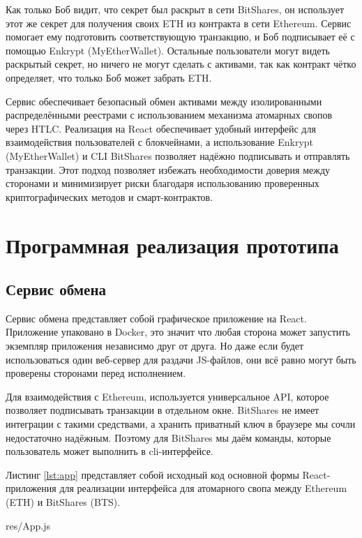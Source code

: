 Как только Боб видит, что секрет был раскрыт в сети BitShares, он использует этот же секрет для получения своих ETH из контракта в сети Ethereum. Сервис помогает ему подготовить соответствующую транзакцию, и Боб подписывает её с помощью Enkrypt (MyEtherWallet). Остальные пользователи могут видеть раскрытый секрет, но ничего не могут сделать с активами, так как контракт чётко определяет, что только Боб может забрать ETH.

Сервис обеспечивает безопасный обмен активами между изолированными распределёнными реестрами с использованием механизма атомарных свопов через HTLC. Реализация на React обеспечивает удобный интерфейс для взаимодействия пользователей с блокчейнами, а использование Enkrypt (MyEtherWallet) и CLI BitShares позволяет надёжно подписывать и отправлять транзакции. Этот подход позволяет избежать необходимости доверия между сторонами и минимизирует риски благодаря использованию проверенных криптографических методов и смарт-контрактов.

\section{Программная реализация прототипа}

\subsection{Сервис обмена}

Сервис обмена представляет собой графическое приложение на React. Приложение упаковано в Docker, это значит что любая сторона может запустить экземпляр приложения независимо друг от друга. Но даже если будет использоваться один веб-сервер для раздачи JS-файлов, они всё равно могут быть проверены сторонами перед исполнением.

Для взаимодействия с Ethereum, используется универсальное API, которое позволяет подписывать транзакции в отдельном окне. BitShares не имеет интеграции с такими средствами, а хранить приватный ключ в браузере мы сочли недостаточно надёжным. Поэтому для BitShares мы даём команды, которые пользователь может выполнить в cli-интерфейсе.

Листинг \ref{lst:app} представляет собой исходный код основной формы React-приложения для реализации интерфейса для атомарного свопа между Ethereum (ETH) и BitShares (BTS).


{res/App.js}

